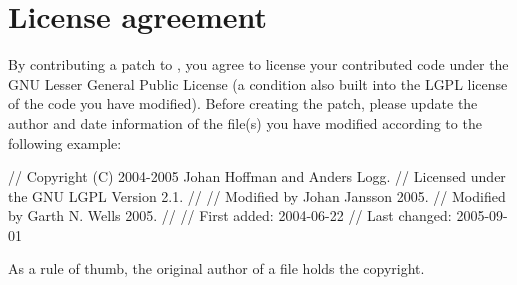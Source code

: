 
\section{License agreement}

By contributing a patch to \package{}, you agree to license your
contributed code under the GNU Lesser General Public License (a
condition also built into the LGPL license of the code you have
modified). Before creating the patch, please update the author and
date information of the file(s) you have modified according to the
following example:

\begin{code}
// Copyright (C) 2004-2005 Johan Hoffman and Anders Logg.
// Licensed under the GNU LGPL Version 2.1.
//
// Modified by Johan Jansson 2005.
// Modified by Garth N. Wells 2005.
//
// First added:  2004-06-22
// Last changed: 2005-09-01
\end{code}

As a rule of thumb, the original author of a file holds the copyright.
